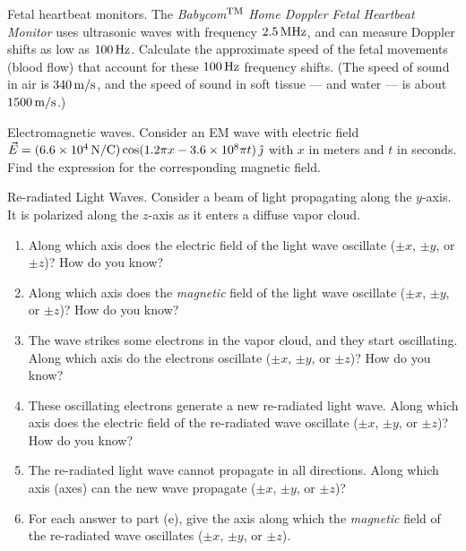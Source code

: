 \begin{aproblem}{Fetal heartbeat monitors.}  
  The {\it Babycom}$^{\rm TM}$ {\it Home Doppler Fetal Heartbeat
    Monitor} uses ultrasonic waves with frequency $2.5\,\mbox{MHz}$,
  and can measure Doppler shifts as low as $100\,\mbox{Hz}$.  Calculate
  the approximate speed of the fetal movements (blood flow) that
  account for these $100\,\mbox{Hz}$ frequency shifts.  (The speed of
  sound in air is $340\,\mbox{m/s}$, and the speed of sound in soft
  tissue --- and water --- is about $1500\,\mbox{m/s}$.)
\end{aproblem}


\begin{aproblem}{Electromagnetic waves.} 
  Consider an EM wave with electric field $\vec{E} = (6.6 \times
  10^4\,\mbox{N/C})\cos(1.2\pi x - 3.6 \times 10^8 \pi t)\,
  \hat{\jmath}$ with $x$ in meters and $t$ in seconds.  Find the
  expression for the corresponding magnetic field.
\end{aproblem}

\newpage

\begin{aproblem}{Re-radiated Light Waves.}  
  Consider a beam of light propagating along the $y$-axis.  It is
  polarized along the $z$-axis as it enters a diffuse vapor cloud.
  \begin{enumerate}
  \item Along which axis does the electric field of the light wave
    oscillate ($\pm x$, $\pm y$, or $\pm z$)?  How do you know?
  \item Along which axis does the {\it magnetic} field of the light
    wave oscillate ($\pm x$, $\pm y$, or $\pm z$)?  How do you know?
  \item The wave strikes some electrons in the vapor cloud, and they
    start oscillating.  Along which axis do the electrons oscillate
    ($\pm x$, $\pm y$, or $\pm z$)?  How do you know?
  \item These oscillating electrons generate a new re-radiated light
    wave. Along which axis does the electric field of the re-radiated
    wave oscillate ($\pm x$, $\pm y$, or $\pm z$)?  How do you know?
  \item The re-radiated light wave cannot propagate in all directions.
    Along which axis (axes) can the new wave propagate ($\pm x$, $\pm
    y$, or $\pm z$)?
  \item For each answer to part (e), give the axis along which the
    {\it magnetic} field of the re-radiated wave oscillates ($\pm x$,
    $\pm y$, or $\pm z$).
  \end{enumerate}
  \label{prob:reradiation}
\end{aproblem}


